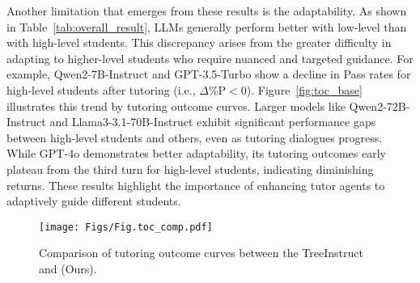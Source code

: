 Another limitation that emerges from these results is the adaptability. 
As shown in Table~\ref{tab:overall_result}, LLMs generally perform better with low-level than with high-level students. This discrepancy arises from the greater difficulty in adapting to higher-level students who require nuanced and targeted guidance. For example, Qwen2-7B-Instruct and GPT-3.5-Turbo show a decline in Pass rates for high-level students after tutoring (i.e., $\Delta\%\text{P}<0$). Figure~\ref{fig:toc_base} illustrates this trend by tutoring outcome curves. Larger models like Qwen2-72B-Instruct and Llama3-3.1-70B-Instruct exhibit significant performance gaps between high-level students and others, even as tutoring dialogues progress. While GPT-4o demonstrates better adaptability, its tutoring outcomes early plateau from the third turn for high-level students, indicating diminishing returns. These results highlight the importance of enhancing tutor agents to adaptively guide different students.


\begin{figure}[t!]
\centering
\texttt{[image: Figs/Fig.toc\_comp.pdf]}
\caption{Comparison of tutoring outcome curves between the TreeInstruct and \model (Ours).}
\label{fig:toc_comp}
\end{figure}

\begin{table}[t!]
\centering
{}
\caption{Ablation study results of our \model.}
\label{tab:ablation_result}
\vspace{-4pt}
\end{table}



